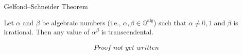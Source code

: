\begin{appendixitem}{Gelfond–Schneider Theorem}
    \begin{theorem}
        Let \( \alpha \) and \( \beta \) be algebraic numbers (i.e., \( \alpha, \beta \in \mathbb{Q}^{\mathrm{alg}} \)) such that \( \alpha \neq 0, 1 \) and \( \beta \) is irrational. Then any value of \( \alpha^\beta \) is transcendental.
    \end{theorem}
    \[
        \substack{\textit{Proof not yet written}}
    \]
\end{appendixitem}
